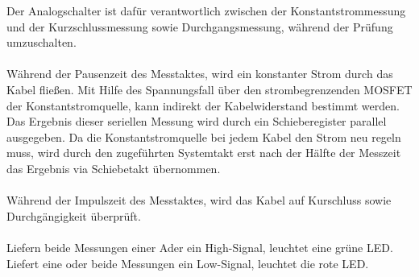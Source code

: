\documentclass[a4paper,11pt]{scrartcl}
\begin{document}
Der Analogschalter ist dafür verantwortlich zwischen der Konstantstrommessung und der Kurzschlussmessung sowie Durchgangsmessung, während der Prüfung umzuschalten. 
\\
\\
Während der Pausenzeit des Messtaktes, wird ein konstanter Strom durch das Kabel fließen. Mit Hilfe des Spannungsfall über den strombegrenzenden MOSFET der Konstantstromquelle, kann indirekt der Kabelwiderstand bestimmt werden. Das Ergebnis dieser seriellen Messung wird durch ein Schieberegister parallel ausgegeben. Da die Konstantstromquelle bei jedem Kabel den Strom neu regeln muss, wird durch den zugeführten Systemtakt erst nach der Hälfte der Messzeit das Ergebnis via Schiebetakt übernommen.
\\
\\
Während der Impulszeit des Messtaktes, wird das Kabel auf Kurschluss sowie Durchgängigkeit überprüft. 
\\
\\
Liefern beide Messungen einer Ader ein High-Signal, leuchtet eine grüne LED. Liefert eine oder beide Messungen ein Low-Signal, leuchtet die rote LED.
\end{document}
